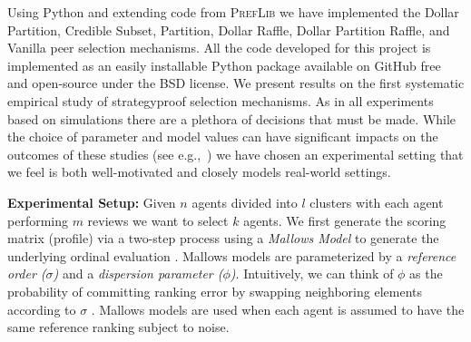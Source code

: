 \documentclass[letterpaper]{article}
\begin{document}
Using Python and extending code from \textsc{PrefLib} \cite{MaWa13a} we have implemented the Dollar Partition, Credible Subset, Partition, Dollar Raffle, Dollar Partition Raffle, and Vanilla peer selection mechanisms. All the code developed for this project is implemented as an easily installable Python package available on GitHub free and open-source under the BSD license.
We present results on the first systematic empirical study of strategyproof selection mechanisms. As in all experiments based on simulations there are a plethora of decisions that must be made.
While the choice of parameter and model values can have significant impacts on the outcomes of these studies (see e.g.,~\cite{PRM13a}) we have chosen an experimental setting that we feel is both well-motivated and closely models real-world settings.

\smallskip
\noindent
\textbf{Experimental Setup:}
Given $n$ agents divided into $l$ clusters with each agent performing $m$ reviews we want to select $k$ agents. We first generate the scoring matrix (profile) via a two-step process
using a \emph{Mallows Model} to generate the underlying ordinal evaluation \cite{Mall57a}. Mallows models are parameterized by a \emph{reference order ($\sigma$)} and a \emph{dispersion parameter ($\phi$)}.
Intuitively, we can think of $\phi$ as the probability of committing ranking error by swapping neighboring elements according to $\sigma$ \cite{LuBo11a}. %
Mallows models are used when each agent is assumed to have the same reference ranking subject to noise.
\end{document}
